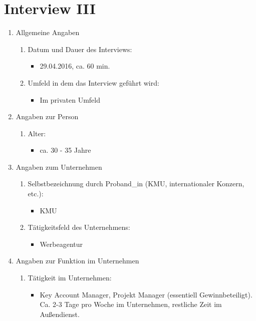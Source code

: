 \documentclass[Bachelorarbeit.tex]{subfiles}
\begin{document}
\section{Interview III}
\begin{enumerate}
	\item Allgemeine Angaben
	\begin{enumerate}
		\item Datum und Dauer des Interviews:
		\begin{itemize}
			\item[] 29.04.2016, ca. 60 min.
		\end{itemize}
		\item Umfeld in dem das Interview geführt wird:
		\begin{itemize}
			\item[] Im privaten Umfeld
		\end{itemize}
	\end{enumerate}
	\item Angaben zur Person
	\begin{enumerate}
		\item Alter:
		\begin{itemize}
			\item[] ca. 30 - 35 Jahre
		\end{itemize}
	\end{enumerate}
	\item Angaben zum Unternehmen
	\begin{enumerate}
		\item Selbstbezeichnung durch Proband\_in  (\ac{KMU}, internationaler Konzern, etc.):
		\begin{itemize}
			\item[] \ac{KMU}
		\end{itemize}
		\item Tätigkeitsfeld des Unternehmens:
		\begin{itemize}
			\item[] Werbeagentur
		\end{itemize}
	\end{enumerate}
	\item Angaben zur Funktion im Unternehmen
	\begin{enumerate}
		\item Tätigkeit im Unternehmen:
		\begin{itemize}
			\item[] Key Account Manager, Projekt Manager (essentiell Gewinnbeteiligt). Ca. 2-3 Tage pro Woche im Unternehmen, restliche Zeit im Außendienst.
		\end{itemize}

\end{enumerate}
\end{enumerate}
\end{document}
